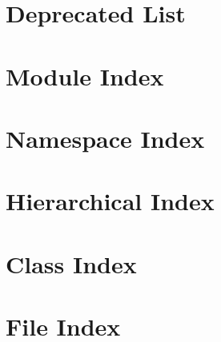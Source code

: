 \documentclass[twoside]{book}
\newcommand{\+}{\discretionary{\mbox{\scriptsize$\hookleftarrow$}}{}{}}
\begin{document}
\chapter{Deprecated List}
\label{deprecated}
\hypertarget{deprecated}{}

\chapter{Module Index}

\chapter{Namespace Index}

\chapter{Hierarchical Index}

\chapter{Class Index}

\chapter{File Index}

\end{document}
